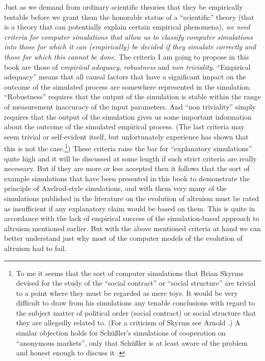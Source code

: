 Just as we demand from ordinary scientific theories that they be empirically
testable before we grant them the honorable status of a ``scientific'' theory
(that is a theory that can potentially explain certain empirical phenomena),
{\em we need criteria for computer simulations that allow us to classify
  computer simulations into those for which it can (empirically) be decided if
  they simulate correctly and those for which this cannot be done.}  The
criteria I am going to propose in this book are those of {\em empirical
  adequacy}, {\em robustness} and {\em non triviality}.  ``Empirical
adequacy'' means that all causal factors that have a significant impact on the
outcome of the simulated process are somewhere represented in the simulation.
``Robustness'' requires that the output of the simulation is stable within the
range of measurement inaccuracy of the input parameters.  And ``non
triviality'' simply requires that the output of the simulation gives us some
important information about the outcome of the simulated empirical process.
(The last criteria may seem trivial or self-evident itself, but unfortunately
experience has shown that this is not the case.\footnote{To me it seems that
  the sort of computer simulations that Brian Skyrms devised for the study of
  the ``social contract'' \cite[]{skyrms:1996} or ``social structure''
  \cite{skyrms:2004} are trivial to a point where they must be regarded as
  mere toys. It would be very difficult to draw from his simulations any
  tenable conclusions with regard to the subject matter of political order
  (social contract) or social structure that they are allegedly related
  to. (For a criticism of Skyrms see Arnold \cite[]{arnold:2005b}.) A similar
  objection holds for Schüßler's simulations of cooperation on ``anonymous
  markets'', only that Schüßler is at least aware of the problem and honest
  enough to discuss it \cite[p.\  91f.]{schuessler:1997}.}) These criteria
raise the bar for ``explanatory simulations'' quite high and it will be
discussed at some length if such strict criteria are really necessary.  But if
they are more or less accepted then it follows that the sort of example
simulations that have been presented in this book to demonstrate the
principle of Axelrod-style simulations, and with them very many of the
simulations published in the literature on the evolution of altruism must be
rated as insufficient if any explanatory claim would be based on them.  This
is quite in accordance with the lack of empirical success of the simulation-based approach to altruism mentioned earlier. But with the above mentioned
criteria at hand we can better understand just why most of the computer models
of the evolution of altruism had to fail.

